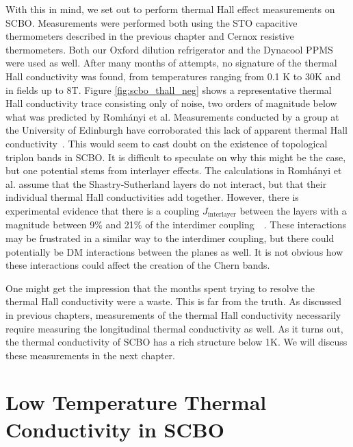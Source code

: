 \documentclass{thesis-umich}
\begin{document}
With this in mind, we set out to perform thermal Hall effect measurements on SCBO. Measurements were performed both using the STO capacitive thermometers described in the previous chapter and Cernox resistive thermometers. Both our Oxford dilution refrigerator and the Dynacool PPMS were used as well. After many months of attempts, no signature of the thermal Hall conductivity was found, from temperatures ranging from 0.1 K to 30K and in fields up to 8T. Figure \ref{fig:scbo_thall_neg} shows a representative thermal Hall conductivity trace consisting only of noise, two orders of magnitude below what was predicted by Romh\'{a}nyi et al. Measurements conducted by a group at the University of Edinburgh have corroborated this lack of apparent thermal Hall conductivity~\cite{CairnsMarchMeeting}. This would seem to cast doubt on the existence of topological triplon bands in SCBO. It is difficult to speculate on why this might be the case, but one potential stems from interlayer effects. The calculations in Romh\'{a}nyi et al. assume that the Shastry-Sutherland layers do not interact, but that their individual thermal Hall conductivities add together. However, there is experimental evidence that there is a coupling $J_{\mathrm{interlayer}}$ between the layers with a magnitude between 9\% and 21\% of the interdimer coupling~\cite{Miyahara2000}~\cite{Knetter2000}. These interactions may be frustrated in a similar way to the interdimer coupling, but there could potentially be DM interactions between the planes as well. It is not obvious how these interactions could affect the creation of the Chern bands.

One might get the impression that the months spent trying to resolve the thermal Hall conductivity were a waste. This is far from the truth. As discussed in previous chapters, measurements of the thermal Hall conductivity necessarily require measuring the longitudinal thermal conductivity as well. As it turns out, the thermal conductivity of SCBO has a rich structure below 1K. We will discuss these measurements in the next chapter.

\section{Low Temperature Thermal Conductivity in SCBO}
\end{document}
